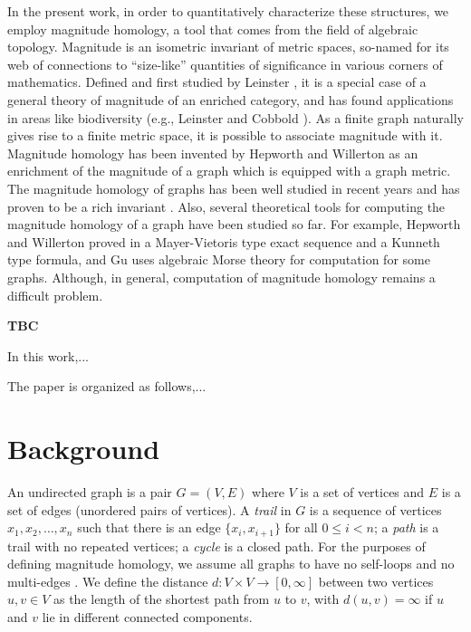 \documentclass{article}
\newcommand{\giuliaB}[1]{\todo[color=yellow!40]{#1}}
\newcommand{\giuliaM}[1]{\todo[color=blue!40]{#1}}
\begin{document}
	In the present work, in order to quantitatively characterize these structures, we employ magnitude homology, a tool that comes from the field of algebraic topology.
	Magnitude is an isometric invariant of metric spaces, so-named for its web of connections to ``size-like'' quantities of significance in various corners of mathematics.
	Defined and first studied by Leinster \cite{leinster2013magnitude}, it is a special case of a general theory of magnitude of an enriched category, and has found applications in areas like biodiversity (e.g., Leinster and Cobbold \cite{leinster2012measuring}).
	As a finite graph naturally gives rise to a finite metric space, it is possible to associate magnitude with it.
	Magnitude homology has been invented by Hepworth and Willerton \cite{hepworth2015categorifying} as an enrichment of the magnitude of a graph which is equipped with a graph metric.
	The magnitude homology of graphs has been well studied in recent years and has proven to be a rich invariant \cite{hepworth2015categorifying,gu2018graph,sazdanovic2021torsion,hepworth2022magnitude,kaneta2021magnitude}.
	Also, several theoretical tools for computing the magnitude homology of a graph have been studied so far. 
	For example, Hepworth and Willerton proved in \cite{hepworth2015categorifying} a Mayer-Vietoris type exact sequence and a Kunneth type formula, %
	and Gu \cite{gu2018graph} uses algebraic Morse theory for computation for some graphs. 
	Although, in general, computation of magnitude homology remains a difficult problem.
	
	\textbf{TBC}
	
	In this work,...
	
	The paper is organized as follows,...
	
	\section{Background}
	
	An undirected graph is a pair $G=(V,E)$ where $V$ is a set of vertices and $E$ is a set of edges (unordered pairs of vertices). A \emph{trail} in $G$ is a sequence of vertices $x_1,x_2,\ldots,x_n$ such that there is an edge $\{x_i,x_{i+1}\}$ for all $0\leq i<n$; a \emph{path} is a trail with no repeated vertices; a \emph{cycle} is a closed path.
	For the purposes of defining magnitude homology, we assume all graphs to have no self-loops and no multi-edges \cite{leinster2019magnitude}.
	We define the distance $d:V \times V \to [0,\infty]$ between two vertices $u,v \in V$  as the length of the shortest path from $u$ to $v$, with $d(u,v) = \infty$ if $u$ and $v$ lie in different connected components.
	
\end{document}
